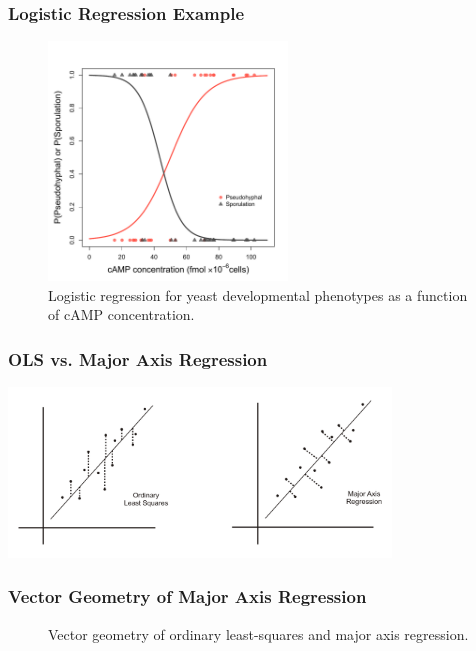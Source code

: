 \documentclass{beamer}
\begin{document}
\begin{frame}
  \frametitle{Logistic Regression Example}
  
\begin{figure}
\begin{center}
\includegraphics[height=2.5in]{cAMP-binary-model}
\end{center}
\caption{Logistic regression for yeast developmental phenotypes as a function of cAMP concentration.}
\end{figure}




\end{frame}


\begin{frame}
  \frametitle{OLS vs. Major Axis Regression}
\begin{center}
\includegraphics[width=4in]{ols_vs_majoraxis}
\end{center}
\end{frame}




\begin{frame}
  \frametitle{Vector Geometry of Major Axis Regression}

\begin{figure}
\begin{center}
\end{center}
\caption{Vector geometry of ordinary least-squares and major axis regression.}
\end{figure}


\end{frame}

\end{document}
